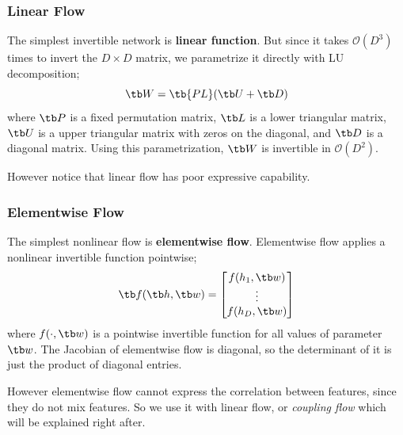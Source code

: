 \documentclass{article}
\begin{document}
        \subsubsection{Linear Flow}
            The simplest invertible network is \textbf{linear function}. But since it takes $\mathcal{O}(D^3)$ times to invert the $D \times D$ matrix,
            we parametrize it directly with LU decomposition;
            \[
            \tb W = \tb{PL}(\tb U + \tb D)
            \]
            where $\tb P$ is a fixed permutation matrix, $\tb L$ is a lower triangular matrix, $\tb U$ is a upper triangular matrix with zeros on the diagonal, and $\tb D$ is a diagonal matrix.
            Using this parametrization, $\tb W$ is invertible in $\mathcal{O}(D^2)$.

            However notice that linear flow has poor expressive capability.

        \subsubsection{Elementwise Flow}
            The simplest nonlinear flow is \textbf{elementwise flow}. Elementwise flow applies a nonlinear invertible function pointwise;
            \[
            \tb f(\tb h, \tb w)=\begin{bmatrix} f(h_1, \tb w) \\ \vdots \\ f(h_D, \tb w) \end{bmatrix}
            \]
            where $f(\cdot, \tb w)$ is a pointwise invertible function for all values of parameter $\tb w$.
            The Jacobian of elementwise flow is diagonal, so the determinant of it is just the product of diagonal entries.

            However elementwise flow cannot express the correlation between features, since they do not mix features. So we use it with
            linear flow, or \emph{coupling flow} which will be explained right after.
\end{document}
